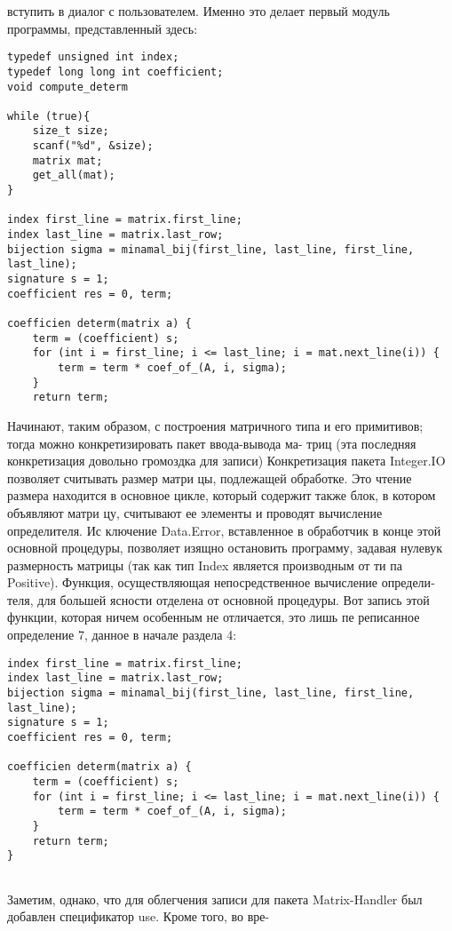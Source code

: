 вступить в диалог с пользователем. Именно это делает первый модуль
программы, представленный здесь:

\begin{lstlisting}
typedef unsigned int index;
typedef long long int coefficient;
void compute_determ

while (true){
	size_t size;
	scanf("%d", &size);
	matrix mat;
	get_all(mat);
}

index first_line = matrix.first_line;
index last_line = matrix.last_row;
bijection sigma = minamal_bij(first_line, last_line, first_line, last_line);
signature s = 1;
coefficient res = 0, term; 

coefficien determ(matrix a) {
	term = (coefficient) s;
	for (int i = first_line; i <= last_line; i = mat.next_line(i)) {
		term = term * coef_of_(A, i, sigma);
	}
	return term;
\end{lstlisting}

Начинают, таким образом, с построения матричного типа и его
примитивов; тогда можно конкретизировать пакет ввода-вывода ма-
\newpage
триц (эта последняя конкретизация довольно громоздка для записи)
Конкретизация пакета Integer.IO позволяет считывать размер матри­
цы, подлежащей обработке. Это чтение размера находится в основное
цикле, который содержит также блок, в котором объявляют матри­
цу, считывают ее элементы и проводят вычисление определителя. Ис­
ключение Data.Error, вставленное в обработчик в конце этой основной
процедуры, позволяет изящно остановить программу, задавая нулевук
размерность матрицы (так как тип Index является производным от ти­
па Positive).
Функция, осуществляющая непосредственное вычисление определи­
теля, для большей ясности отделена от основной процедуры. Вот запись
этой функции, которая ничем особенным не отличается, это лишь пе­
реписанное определение 7, данное в начале раздела 4:

\begin{lstlisting}
index first_line = matrix.first_line;
index last_line = matrix.last_row;
bijection sigma = minamal_bij(first_line, last_line, first_line, last_line);
signature s = 1;
coefficient res = 0, term; 

coefficien determ(matrix a) {
	term = (coefficient) s;
	for (int i = first_line; i <= last_line; i = mat.next_line(i)) {
		term = term * coef_of_(A, i, sigma);
	}
	return term;
}
	
\end{lstlisting}

Заметим, однако, что для облегчения записи для пакета
Matrix-Handler был добавлен спецификатор use. Кроме того, во вре-
\newpage

